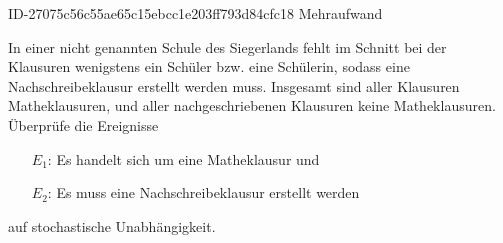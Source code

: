\begin{exercise}
      {ID-27075c56c55ae65c15ebcc1e203ff793d84cfc18}
      {Mehraufwand}
  \ifproblem\problem\par
    In einer nicht genannten Schule des Siegerlands
    fehlt im Schnitt bei  der Klausuren
    wenigstens ein Schüler bzw. eine Schülerin,
    sodass eine Nachschreibeklausur erstellt werden
    muss.
    Insgesamt sind  aller Klausuren Matheklausuren,
    und  aller nachgeschriebenen Klausuren keine
    Matheklausuren.
    Überprüfe die Ereignisse
    \begin{itemize}
      \item[$E_1$:] \glqq Es handelt sich um eine
                    Matheklausur\grqq{} und
      \item[$E_2$:] \glqq Es muss eine Nachschreibeklausur
                    erstellt werden\grqq
    \end{itemize}
    auf stochastische Unabhängigkeit.
  \fi
\end{exercise}
